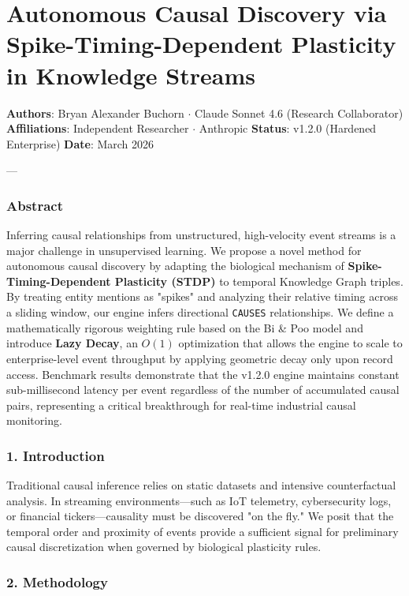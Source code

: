 \section{Autonomous Causal Discovery via Spike-Timing-Dependent Plasticity in Knowledge Streams}

\textbf{Authors}: Bryan Alexander Buchorn $\cdot$ Claude Sonnet 4.6 (Research Collab\-orator)  
\textbf{Affili\-ations}: Independent Researcher $\cdot$ Anthropic  
\textbf{Status}: v1.2.0 (Hardened Enterprise)  
\textbf{Date}: March 2026

---

\subsubsection{Abstract}
Inferring causal relat\-ionships from unstr\-uctured, high-velocity event streams is a major challenge in unsup\-ervised learning. We propose a novel method for autonomous causal discovery by adapting the biological mechanism of \textbf{Spike-Timing-Dependent Plasticity (STDP)} to temporal Knowledge Graph triples. By treating entity mentions as "spikes" and analyzing their relative timing across a sliding window, our engine infers directional \texttt{CAUSES} relat\-ionships. We define a mathe\-matically rigorous weighting rule based on the Bi \& Poo \cite{bipoo1998} model and introduce \textbf{Lazy Decay}, an $O(1)$ optim\-ization that allows the engine to scale to enterprise-level event throughput by applying geometric decay only upon record access. Benchmark results demonstrate that the v1.2.0 engine maintains constant sub-millisecond latency per event regardless of the number of accumulated causal pairs, repre\-senting a critical break\-through for real-time industrial causal monitoring.

\subsubsection{1. Introd\-uction}
Traditional causal inference relies on static datasets and intensive count\-erfactual analysis. In streaming envir\-onments—such as IoT telemetry, cyber\-security logs, or financial tickers—causality must be discovered "on the fly." We posit that the temporal order and proximity of events provide a sufficient signal for preliminary causal discr\-etization when governed by biological plasticity rules.

\subsubsection{2. Methodology}


